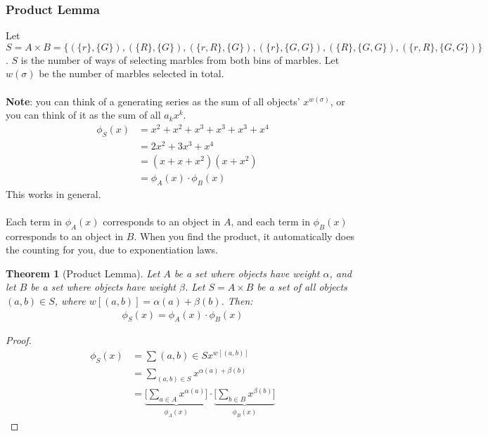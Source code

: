 \documentclass[]{article}
\newtheorem{theorem}{Theorem}[section]
\theoremstyle{definition}
\newcommand{\lecture}[1]{\marginpar{{\footnotesize $\leftarrow$ \underline{#1}}}}
\begin{document}
			\subsubsection{Product Lemma} \lecture{January 18, 2013}
				Let $S = A \times B = \{ (\{r\}, \{G\}), (\{R\}, \{G\}), (\{r, R\}, \{G\}), (\{r\}, \{G, G\}), (\{R\}, \{G, G\}), (\{r, R\}, \{G, G\}) \}$. $S$ is the number of ways of selecting marbles from both bins of marbles. Let $w(\sigma)$ be the number of marbles selected in total.
				\\ \\
				\textbf{Note}: you can think of a generating series as the sum of all objects' $x^{w(\sigma)}$, or you can think of it as the sum of all $a_k x^k$.
				\begin{align*}
					\phi_S(x) &= x^2 + x^2 + x^3 + x^3 + x^3 + x^4 \\
					&= 2x^2 + 3x^3 + x^4 \\
					&= (x + x + x^2)(x + x^2) \\
					&= \phi_A(x) \cdot \phi_B(x)
				\end{align*}
				This works in general.
				\\ \\
				Each term in $\phi_A(x)$ corresponds to an object in $A$, and each term in $\phi_B(x)$ corresponds to an object in $B$. When you find the product, it automatically does the counting for you, due to exponentiation laws.
				\begin{theorem}[Product Lemma]
					Let $A$ be a set where objects have weight $\alpha$, and let $B$ be a set where objects have weight $\beta$. Let $S = A \times B$ be a set of all objects $(a, b) \in S$, where $w[(a, b)] = \alpha(a) + \beta(b)$. Then:
					\begin{align*}
						\phi_S(x) = \phi_A(x) \cdot \phi_B(x)
					\end{align*}
				\end{theorem}

				\begin{proof}
					\begin{align*}
						\phi_S(x) &= \sum{(a, b) \in S} x^{w[(a, b)]} \\
						&= \sum_{(a, b) \in S} x^{\alpha(a) + \beta(b)} \\
						&= \underbrace{\bigg[ \sum_{a \in A} x^{\alpha(a)} \bigg]}_{\phi_A(x)} \cdot \underbrace{\bigg[ \sum_{b \in B} x^{\beta(b)} \bigg]}_{\phi_B(x)}
					\end{align*}
				\end{proof}
			
\end{document}

